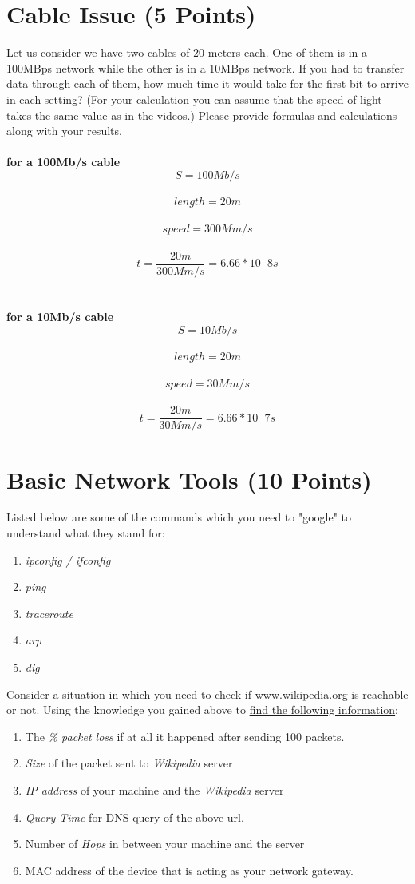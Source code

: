 \documentclass{WeSTassignment}
\begin{document}

\section{Cable Issue (5 Points)}

Let us consider we have two cables of 20 meters each. One of them is in a 100MBps network while the other is in a 10MBps network. If you had to transfer data through each of them, how much time it would take for the first bit to arrive in each setting? (For your calculation you can assume that the speed of light takes the same value as in the videos.) Please provide formulas and calculations along with your results. \\
\\ \textbf{for a 100Mb/s cable}
\[S  = 100M b/s\] \\
\[length = 20 m\] \\
\[speed  = 300M m/s\] \\
\[t  = \frac{20m}{300M m/s} = 6.66*10^-8 s\] \\
\\ \textbf{for a 10Mb/s cable}
\[S  = 10M b/s\] \\
\[length = 20 m\] \\
\[speed  = 30M m/s\] \\
\[t  = \frac{20m}{30M m/s} = 6.66*10^-7 s\]


\section{Basic Network Tools (10 Points)}

Listed below are some of the commands which you need to "google" to understand what they stand for:
\begin{enumerate}
\item \emph{ipconfig / ifconfig}
\item \emph{ping}
\item \emph{traceroute}
\item \emph{arp}
\item \emph{dig}
\end{enumerate}

Consider a situation in which you need to check if \url{www.wikipedia.org} is reachable or not. Using the knowledge you gained above to \underline{find the following information}:
\begin{enumerate}
\itemsep0em
\item The \emph{\% packet loss} if at all it happened after sending 100 packets. 
\item \emph{Size} of the packet sent to \emph{Wikipedia} server
\item \emph{IP address} of your machine and the \emph{Wikipedia} server
\item \emph{Query Time} for DNS query of the above url.
\item Number of \emph{Hops} in between your machine and the server
\item MAC address of the device that is acting as your network gateway. 
\end{enumerate}
\end{document}
